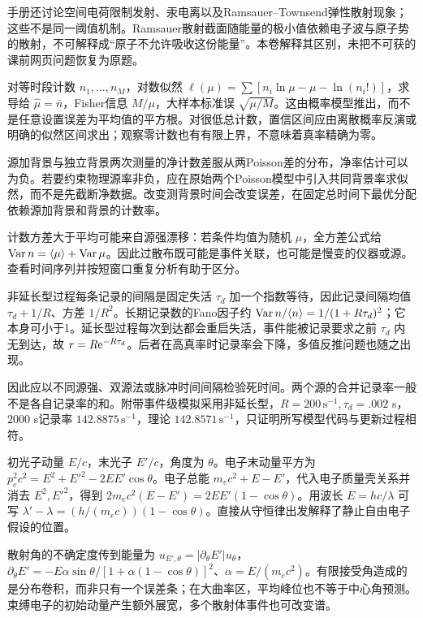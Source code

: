 手册还讨论空间电荷限制发射、汞电离以及Ramsauer--Townsend弹性散射现象；这些不是同一阈值机制。Ramsauer散射截面随能量的极小值依赖电子波与原子势的散射，不可解释成“原子不允许吸收这份能量”。本卷解释其区别，未把不可获的课前网页问题恢复为原题。

对等时段计数 $n_1,\ldots,n_M$，对数似然 $\ell(\mu)=\sum[n_i\ln\mu-\mu-\ln(n_i!)]$，求导给 $\hat\mu=\bar n$，Fisher信息 $M/\mu$，大样本标准误 $\sqrt{\mu/M}$。这由概率模型推出，而不是任意设置误差为平均值的平方根。对很低总计数，置信区间应由离散概率反演或明确的似然区间求出；观察零计数也有有限上界，不意味着真率精确为零。

源加背景与独立背景两次测量的净计数差服从两Poisson差的分布，净率估计可以为负。若要约束物理源率非负，应在原始两个Poisson模型中引入共同背景率求似然，而不是先截断净数据。改变测背景时间会改变误差，在固定总时间下最优分配依赖源加背景和背景的计数率。

计数方差大于平均可能来自源强漂移：若条件均值为随机 $\mu$，全方差公式给 $\operatorname{Var}n=\langle \mu\rangle+\operatorname{Var}\mu$。因此过散布既可能是事件关联，也可能是慢变的仪器或源。查看时间序列并按短窗口重复分析有助于区分。

非延长型过程每条记录的间隔是固定失活 $\tau_d$ 加一个指数等待，因此记录间隔均值 $\tau_d+1/R$、方差 $1/R^2$。长期记录数的Fano因子约 $\operatorname{Var}n/\langle n\rangle=1/(1+R\tau_d)^2$；它本身可小于1。延长型过程每次到达都会重启失活，事件能被记录要求之前 $\tau_d$ 内无到达，故 $r=R\mathrm e^{-R\tau_d}$。后者在高真率时记录率会下降，多值反推问题也随之出现。

因此应以不同源强、双源法或脉冲时间间隔检验死时间。两个源的合并记录率一般不是各自记录率的和。附带事件级模拟采用非延长型，$R=200\,\mathrm{s^{-1}},\tau_d=.002$ s，2000 s记录率 $142.8875\,\mathrm{s^{-1}}$，理论 $142.8571\,\mathrm{s^{-1}}$，只证明所写模型代码与更新过程相符。

初光子动量 $E/c$，末光子 $E'/c$，角度为 $\theta$。电子末动量平方为 $p_e^2c^2=E^2+E'^2-2EE'\cos\theta$。电子总能 $m_ec^2+E-E'$，代入电子质量壳关系并消去 $E^2,E'^2$，得到 $2m_ec^2(E-E')=2EE'(1-\cos\theta)$。用波长 $E=hc/\lambda$ 可写 $\lambda'-\lambda=(h/(m_ec))(1-\cos\theta)$。直接从守恒律出发解释了静止自由电子假设的位置。

散射角的不确定度传到能量为 $u_{E',\theta}=|\partial_\theta E'|u_\theta$，$\partial_\theta E'=-E\alpha\sin\theta/[1+\alpha(1-\cos\theta)]^2$、$\alpha=E/(m_ec^2)$。有限接受角造成的是分布卷积，而非只有一个误差条；在大曲率区，平均峰位也不等于中心角预测。束缚电子的初始动量产生额外展宽，多个散射体事件也可改变谱。

